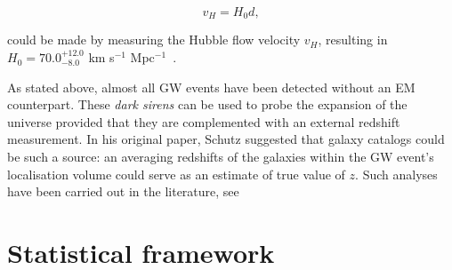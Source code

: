 \documentclass[%
 reprint,
 amsmath,amssymb,
 aps,
]{revtex4-2}
\begin{document}
\begin{equation}
    v_H = H_0 d,
\end{equation}

could be made by measuring the Hubble flow velocity $v_H$, resulting in $H_0 = 70.0^{+12.0}_{-8.0}$ km s$^{-1}$ Mpc$^{-1}$~\cite{LIGOScientific:2017adf}.

As stated above, almost all GW events have been detected without an EM counterpart. These \textit{dark sirens} can be used to probe the expansion of the universe provided that they are complemented with an external redshift measurement. In his original paper, Schutz suggested that galaxy catalogs could be such a source: an averaging redshifts of the galaxies within the GW event's localisation volume could serve as an estimate of true value of $z$. Such analyses have been carried out in the literature, see~\onlinecite{}



\section{\label{sec:framework}Statistical framework}

\end{document}
